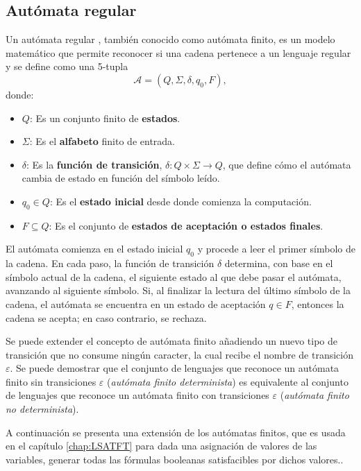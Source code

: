 \subsection{Autómata regular}

Un autómata regular \cite{authomataTheory}, también conocido como autómata finito, es un modelo matemático que 
permite reconocer si una cadena pertenece a un lenguaje regular y se define como una 5-tupla $$\mathcal{A} = (Q, \Sigma, \delta, q_0, F),$$ donde:

\begin{itemize}
  \item $Q$: Es un conjunto finito de \textbf{estados}.
  \item $\Sigma$: Es el \textbf{alfabeto} finito de entrada.
  \item $\delta$: Es la \textbf{función de transición}, $\delta: Q \times \Sigma \to Q$, que define cómo el autómata cambia de estado en función del símbolo leído.
  \item $q_0 \in Q$: Es el \textbf{estado inicial} desde donde comienza la computación.
  \item $F \subseteq Q$: Es el conjunto de \textbf{estados de aceptación o estados finales}.
\end{itemize}

El autómata comienza en el estado inicial $q_0$ y procede a leer el primer símbolo de la cadena.
En cada paso, la función de transición $\delta$ determina, con base en el símbolo actual de la cadena, el siguiente estado al que debe pasar el autómata, avanzando al siguiente símbolo.
Si, al finalizar la lectura del último símbolo de la cadena, el autómata se encuentra en un estado de aceptación 
$q \in F$, entonces la cadena se acepta; en caso contrario, se rechaza.

Se puede extender el concepto de autómata finito añadiendo un nuevo tipo de transición que no consume ningún caracter, 
la cual recibe el nombre de transición $\varepsilon$. Se puede demostrar \cite{authomataTheory} que el 
conjunto de lenguajes que reconoce un autómata finito sin transiciones $\varepsilon$
(\textit{autómata finito determinista}) es equivalente al conjunto de lenguajes que reconoce 
un autómata finito con transiciones $\varepsilon$ (\textit{autómata finito no determinista}).

A continuación se presenta una extensión de los autómatas finitos, que es usada en el
capítulo \ref{chap:LSATFT} para dada una asignación de valores de las variables, generar todas las fórmulas
booleanas satisfacibles por dichos valores..

